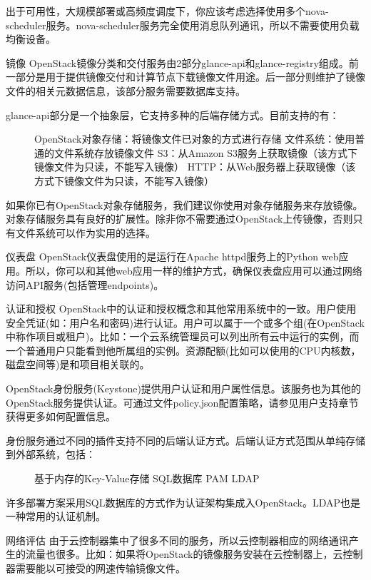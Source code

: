 \documentclass[letterpaper,10pt,english]{sphinxmanual}
\begin{document}
出于可用性，大规模部署或高频度调度下，你应该考虑选择使用多个nova-scheduler服务。nova-scheduler服务完全使用消息队列通讯，所以不需要使用负载均衡设备。

镜像
OpenStack镜像分类和交付服务由2部分glance-api和glance-registry组成。前一部分是用于提供镜像交付和计算节点下载镜像文件用途。后一部分则维护了镜像文件的相关元数据信息，该部分服务需要数据库支持。
\begin{description}
\item[{glance-api部分是一个抽象层，它支持多种的后端存储方式。目前支持的有：}] \leavevmode
OpenStack对象存储：将镜像文件已对象的方式进行存储
文件系统：使用普通的文件系统存放镜像文件
S3：从Amazon S3服务上获取镜像（该方式下镜像文件为只读，不能写入镜像）
HTTP：从Web服务器上获取镜像（该方式下镜像文件为只读，不能写入镜像）

\end{description}

如果你已有OpenStack对象存储服务，我们建议你使用对象存储服务来存放镜像。对象存储服务具有良好的扩展性。除非你不需要通过OpenStack上传镜像，否则只有文件系统可以作为实用的选择。

仪表盘
OpenStack仪表盘使用的是运行在Apache httpd服务上的Python web应用。所以，你可以和其他web应用一样的维护方式，确保仪表盘应用可以通过网络访问API服务(包括管理endpoints)。

认证和授权
OpenStack中的认证和授权概念和其他常用系统中的一致。用户使用安全凭证(如：用户名和密码)进行认证。用户可以属于一个或多个组(在OpenStack中称作项目或租户)。比如：一个云系统管理员可以列出所有云中运行的实例，而一个普通用户只能看到他所属组的实例。资源配额(比如可以使用的CPU内核数，磁盘空间等)是和项目相关联的。

OpenStack身份服务(Keystone)提供用户认证和用户属性信息。该服务也为其他的OpenStack服务提供认证。可通过文件policy.json配置策略，请参见用户支持章节获得更多如何配置信息。
\begin{description}
\item[{身份服务通过不同的插件支持不同的后端认证方式。后端认证方式范围从单纯存储到外部系统，包括：}] \leavevmode
基于内存的Key-Value存储
SQL数据库
PAM
LDAP

\end{description}

许多部署方案采用SQL数据库的方式作为认证架构集成入OpenStack。LDAP也是一种常用的认证机制。

网络评估
由于云控制器集中了很多不同的服务，所以云控制器相应的网络通讯产生的流量也很多。比如：如果将OpenStack的镜像服务安装在云控制器上，云控制器需要能以可接受的网速传输镜像文件。
\end{document}
